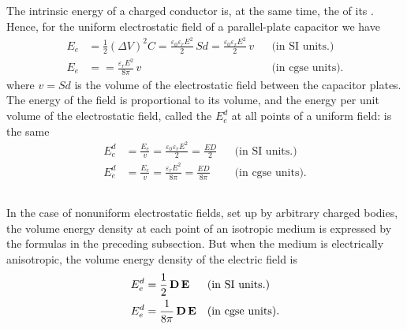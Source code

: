 \subsection{}\label{19.1.3} The intrinsic energy of a charged conductor is, at the same time, the  of its . Hence, for the uniform electrostatic field  of a parallel-plate capacitor  we have
\begin{align*}
E_{e} & = \frac{1}{2} (\Delta V)^{2}C  = \frac{\varepsilon_{0}\varepsilon_{r}E^{2}}{2}\, Sd = \frac{\varepsilon_{0}\varepsilon_{r}E^{2}}{2} \, v && \text{(in SI units.)} \\
E_{e} & =  = \frac{\varepsilon_{r}E^{2}}{8\pi} \, v&& \text{(in cgse units).}
\end{align*}
where $v = Sd$ is the volume of the electrostatic field between the capacitor plates. The energy of the field is proportional to its volume, and the energy per unit volume of the electrostatic field, called the  $E_{e}^{d}$ at all points of a uniform field:
is the same
\begin{align*}
E_{e}^{d} & = \frac{E_{e}}{v} = \frac{\varepsilon_{0}\varepsilon_{r}E^{2}}{2} = \frac{ED}{2} && \text{(in SI units.)} \\
E_{e}^{d} & = \frac{E_{e}}{v} = \frac{\varepsilon_{r}E^{2}}{8 \pi} = \frac{ED}{8 \pi}&& \text{(in cgse units).}
\end{align*}

\subsection{}\label{19.1.4} In the case of nonuniform electrostatic fields, set up by arbitrary charged bodies, the volume energy density at each point of an isotropic medium is expressed by the formulas in the preceding subsection. But when the medium is electrically anisotropic, the volume energy density of the electric field is
\begin{align*}
E_{e}^{d} & = \frac{1}{2} \, \vb{D} \, \vb{E}&& \text{(in SI units.)} \\
E_{e}^{d} & = \frac{1}{8 \pi} \, \vb{D} \, \vb{E}&& \text{(in cgse units).}
\end{align*}

